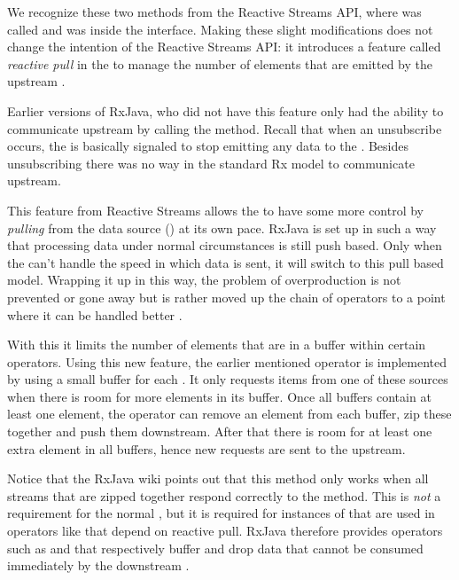We recognize these two methods from the Reactive Streams API, where  was called  and  was inside the  interface. Making these slight modifications does not change the intention of the Reactive Streams API: it introduces a feature called \textit{reactive pull} in the \obv to manage the number of elements that are emitted by the upstream \obs.

Earlier versions of RxJava, who did not have this feature only had the ability to communicate upstream by calling the  method. Recall that when an unsubscribe occurs, the \obs is basically signaled to stop emitting any data to the \obv. Besides unsubscribing there was no way in the standard Rx model to communicate upstream.

This feature from Reactive Streams allows the \obv to have some more control by \emph{pulling} from the data source (\obs) at its own pace. RxJava is set up in such a way that processing data under normal circumstances is still push based. Only when the \obv can't handle the speed in which data is sent, it will switch to this pull based model. Wrapping it up in this way, the problem of overproduction is not prevented or gone away but is rather moved up the chain of operators to a point where it can be handled better \cite{RxJava-Wiki-Backpressure}.

With this it limits the number of elements that are in a buffer within certain operators. Using this new feature, the earlier mentioned  operator is implemented by using a small buffer for each \obs. It only requests items from one of these sources when there is room for more elements in its buffer. Once all buffers contain at least one element, the operator can remove an element from each buffer, zip these together and push them downstream. After that there is room for at least one extra element in all buffers, hence new requests are sent to the upstream.

Notice that the RxJava wiki \cite{RxJava-Wiki-Backpressure} points out that this method only works when all streams that are zipped together respond correctly to the  method. This is \emph{not} a requirement for the normal \obs, but it is required for instances of \obs that are used in operators like  that depend on reactive pull. RxJava therefore provides operators such as  and  that respectively buffer and drop data that cannot be consumed immediately by the downstream \obv.

